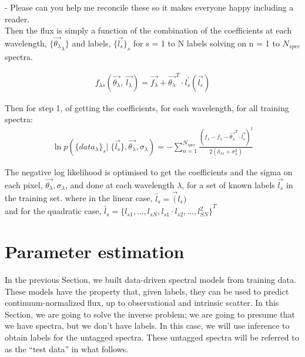 \documentclass[12pt, preprint]{aastex}
\newcommand{\sectionname}{Section}
\newcommand{\mean}[1]{\overline{#1}}
\begin{document}
- Please can you help me reconcile these so it makes everyone happy including a reader. \\


Then the flux is simply a function of the combination of the coefficients at each wavelength, $\{ \vec{\theta_\lambda}_\lambda \}$ and labels, $\{ \vec{l_{s}} \}_s$ for s = 1 to N labels solving on n = 1 to $N_{spec}$ spectra. 

 \begin{eqnarray}
f_{\lambda s}(\vec{\theta_{\lambda}},  \: \vec{l_\lambda} ) = \vec{f_\lambda} + {\vec{\theta_\lambda}^T \cdot l_s^{'} ( \vec{l_s})}
\end{eqnarray}

Then for step 1, of getting the coefficients, for each wavelength, for all training spectra: \\

 \begin{eqnarray}
\ln p ( \{ data_\lambda \}_s | \; \{ \vec{l_s} \}, \vec{\theta_\lambda }, {\sigma_\lambda} )  = 
- \sum\limits_{n=1}^{N_{spec}}  \frac{(f_\lambda - \mean{f_\lambda} - \vec{\theta_\lambda }^T  \cdot \vec{l_s})^2} {2(\delta_{\lambda s} + \sigma_\lambda^{2})}
\end{eqnarray}

The negative log likelihood is optimised to get the coefficients and the sigma on each pixel, $\vec{\theta_\lambda}, \sigma_\lambda$, and done at each wavelength $\lambda$, for a set of known labels $\vec{l_s}$ in the training set. 
\noindent where in the linear case, $\tilde{l_s} = \vec(l_s)$ \\
and for the quadratic case,  $\tilde{l_s} = { \{l_{s1}, ... , l_{sN}, l_{s1} \cdot l_{s2} , ..., l_{SN}^2\}}^T $\\



\section{Parameter estimation}

In the previous \sectionname, we built data-driven spectral models
from training data.
These models have the property that, given labels, they can be used to
predict continuum-normalized flux, up to observational and intrinsic
scatter.
In this \sectionname, we are going to solve the inverse problem; we
are going to presume that we have spectra, but we don't have labels.
In this case, we will use inference to obtain labels for the untagged
spectra.
These untagged spectra will be referred to as the ``test data'' in
what follows.
\end{document}
